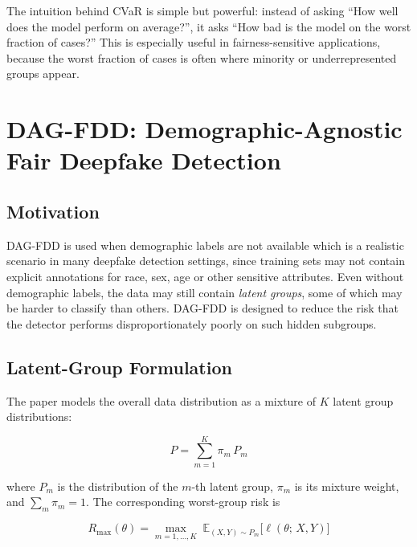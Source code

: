 The intuition behind CVaR is simple but powerful: instead of asking ``How well does the model perform on average?'', it asks ``How bad is the model on the worst fraction of cases?'' This is especially useful in fairness-sensitive applications, because the worst fraction of cases is often where minority or underrepresented groups appear.

\section{DAG-FDD: Demographic-Agnostic Fair Deepfake Detection}
\label{sec:dag_fdd}

\subsection{Motivation}
\label{subsec:dag_motivation}

DAG-FDD is used when demographic labels are not available which is a realistic scenario in many deepfake detection settings, since training sets may not contain explicit annotations for race, sex, age or other sensitive attributes. Even without demographic labels, the data may still contain \emph{latent groups}, some of which may be harder to classify than others. DAG-FDD is designed to reduce the risk that the detector performs disproportionately poorly on such hidden subgroups.

\subsection{Latent-Group Formulation}
\label{subsec:dag_latent}

The paper models the overall data distribution as a mixture of $K$ latent group distributions:

\begin{equation}
    P = \sum_{m=1}^{K} \pi_m\, P_m
    \label{eq:mixture}
\end{equation}

\noindent where $P_m$ is the distribution of the $m$-th latent group, $\pi_m$ is its mixture weight, and $\sum_m \pi_m = 1$. The corresponding worst-group risk is

\begin{equation}
    R_{\max}(\theta)
    = \max_{m=1,\ldots,K}\;
      \mathbb{E}_{(X,Y)\sim P_m}\bigl[\ell(\theta;\,X,Y)\bigr]
    \label{eq:worst_group_risk}
\end{equation}

